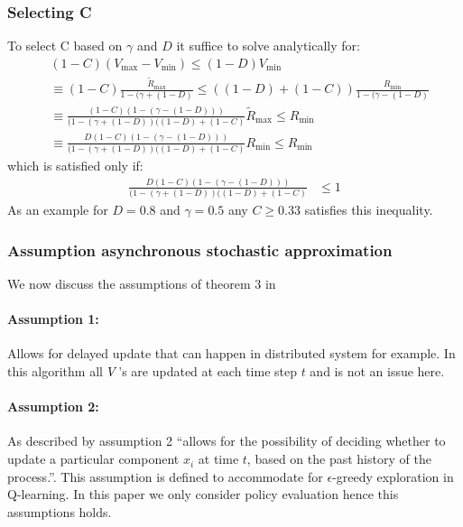 \subsubsection{Selecting C}\label{set_gamma}
To select C based on $\gamma$ and $D$ it suffice to solve analytically for:
\begin{equation}
\begin{split}
    &(1-C)(V_{\max} - V_{\min}) \leq (1-D)V_{\min} \\
    &\equiv (1-C)\frac{\widetilde{R}_{\max}}{1-(\gamma + (1-D)} \leq ((1-D)+(1-C)) \frac{R_{\min}}{1-(\gamma - (1-D)}\\
    &\equiv \frac{(1-C)(1-(\gamma-(1-D)))}{(1-(\gamma + (1-D))((1-D)+(1-C)} \widetilde{R}_{\max}\leq R_{\min} \\
    &\equiv \frac{D(1-C)(1-(\gamma-(1-D)))}{(1-(\gamma + (1-D))((1-D)+(1-C)} R_{\min} \leq R_{\min}
\end{split}
\end{equation}
which is satisfied only if:
\begin{equation}
\begin{split}
    \frac{D(1-C)(1-(\gamma-(1-D)))}{(1-(\gamma + (1-D))((1-D)+(1-C)} &\leq 1
\end{split}
\end{equation}
As an example for $D = 0.8$ and $\gamma = 0.5$ any $C\geq 0.33$ satisfies this inequality.
\subsubsection{Assumption asynchronous stochastic approximation}\label{assumption}
We now discuss the assumptions of theorem 3 in \cite{tsitsiklis1994asynchronous} 
\paragraph{Assumption 1:} Allows for delayed update that can happen in distributed system for example. In this algorithm all $V$'s are updated at each time step $t$ and is not an issue here.
\paragraph{Assumption 2: } As described by \cite{tsitsiklis1994asynchronous} assumption 2 ``allows for the possibility of deciding whether to update a particular component $x_i$ at time $t$, based on the past history of the process.''. This assumption is defined to accommodate for $\epsilon$-greedy exploration in Q-learning. In this paper we only consider policy evaluation hence this assumptions holds.
